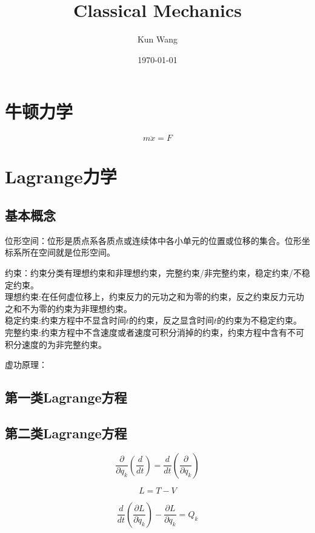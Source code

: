 \documentclass[12pt]{article}
\title{Classical Mechanics}
\author{Kun Wang}
\date{\today}
\numberwithin{equation}{section}
\begin{document}
        \maketitle
        \section{牛顿力学}
        \begin{equation}
            m\ddot{x}=F
        \end{equation}

        \section{Lagrange力学}
        \subsection{基本概念\cite{2006shen}}
        位形空间：位形是质点系各质点或连续体中各小单元的位置或位移的集合。位形坐标系所在空间就是位形空间。\par
        约束：约束分类有理想约束和非理想约束，完整约束/非完整约束，稳定约束/不稳定约束。\\
        理想约束:在任何虚位移上，约束反力的元功之和为零的约束，反之约束反力元功之和不为零的约束为非理想约束。\\
        稳定约束:约束方程中不显含时间$t$的约束，反之显含时间$t$的约束为不稳定约束。\\
        完整约束:约束方程中不含速度或者速度可积分消掉的约束，约束方程中含有不可积分速度的为非完整约束。
        \par
        虚功原理：
        \subsection{第一类Lagrange方程}
        \subsection{第二类Lagrange方程}
        \begin{equation}
            \frac{\partial}{\partial q_k}\left(\frac{d}{dt}\right)=\frac{d}{dt}\left(\frac{\partial}{\partial q_k}\right)
        \end{equation}

        \begin{equation}
            L=T-V
        \end{equation}

        \begin{equation}
            \frac{d}{dt}\left(\frac{\partial L}{\partial \dot{q}_k}\right)-\frac{\partial L}{\partial q_k}=Q_k
        \end{equation}

        
    
\end{document}
